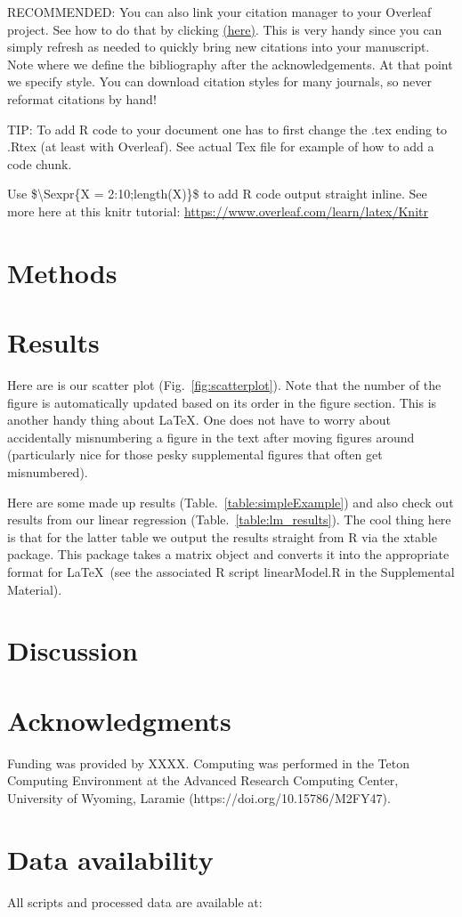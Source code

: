 \begin{linenumbers}
RECOMMENDED: You can also link your citation manager to your Overleaf project. See how to do that by clicking \href{https://www.overleaf.com/learn/latex/Bibliography_management_with_bibtex}{(here)}. This is very handy since you can simply refresh as needed to quickly bring new citations into your manuscript. Note where we define the bibliography after the acknowledgements. At that point we specify style. You can download citation styles for many journals, so never reformat citations by hand!

TIP:  
To add R code to your document one has to first change the .tex ending to .Rtex (at least with Overleaf). See actual Tex file for example of how to add a code chunk.

Use \$\textbackslash Sexpr\{X = 2:10;length(X)\}\$ to add R code output straight inline. See more here at this knitr tutorial: \url{https://www.overleaf.com/learn/latex/Knitr}

\section*{Methods}

\section*{Results}
Here are is our scatter plot (Fig.~\ref{fig:scatterplot}). Note that the number of the figure is automatically updated based on its order in the figure section. This is another handy thing about \LaTeX. One does not have to worry about accidentally misnumbering a figure in the text after moving figures around (particularly nice for those pesky supplemental figures that often get misnumbered).

Here are some made up results (Table.~\ref{table:simpleExample}) and also check out results from our linear regression (Table.~\ref{table:lm_results}). The cool thing here is that for the latter table we output the results straight from R via the xtable package. This package takes a matrix object and converts it into the appropriate format for \LaTeX\ (see the associated R script linearModel.R in the Supplemental Material).

\section*{Discussion}

\section*{Acknowledgments}
Funding was provided by XXXX. Computing was performed in the Teton Computing Environment at the Advanced Research Computing Center, University of Wyoming, Laramie (https://doi.org/10.15786/M2FY47).

\section*{Data availability}
All scripts and processed data are available at:

\end{linenumbers}

